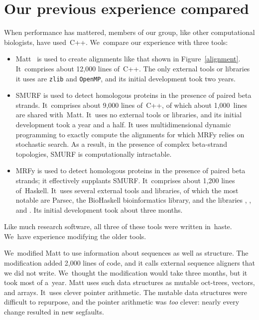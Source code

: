 \documentclass[nonatbib]{sigplanconf}
\newcommand\figref[1]{Figure~\ref{#1}}
\newcommand\seclabel[1]{\label{sec:#1}}
\let\cite\citep
\begin{document}
 
 
\section{Our previous experience compared}
\seclabel{comparo}

When performance has mattered, members of our group, like other
computational biologists, have used~C++.
We~compare our experience with three tools:
\begin{itemize}
\item
Matt~\cite{Menke:2008wu} is used to create alignments like that shown
in \figref{alignment}.
It~comprises about 12,000 lines of~C++.
The only external tools or libraries it uses are \texttt{zlib}
and \texttt{OpenMP}, and its initial development took two years.
\item
SMURF
\cite{Menke:2010ti} is used to detect homologous proteins in the presence
of paired beta strands.
It~comprises about 9,000 lines of~C++, of which about 1,000~lines are
shared with~Matt.
It~uses no external tools or libraries, and
its initial development took a year and a half.
It uses multidimensional dynamic programming to exactly compute the alignments
for which MRFy relies on stochastic search.
As a result, in the presence of complex beta-strand topologies, SMURF is
computationally intractable.
\item
MRFy is used to detect homologous proteins in the presence of paired
beta strands; it effectively supplants SMURF.
It~comprises about 1,200 lines of~Haskell.
It~uses several external tools and libraries, of which the most
notable are Parsec, the BioHaskell bioinformatics library, and
the libraries , ,
and .
Its initial development took about three months.
\end{itemize}
Like much research software, all three of these tools were written
 in~haste.
We~have experience modifying the older tools.



We~modified Matt to use information about sequences as well as structure.
The modification added 2,000 lines of code, and it calls
external sequence aligners that we did not write.
We~thought the modification would take three months, 
but it took most of a~year.
Matt uses such
data structures as mutable oct-trees, vectors, and arrays.
It~uses clever pointer arithmetic.
The mutable data structures were difficult to 
repurpose, and the pointer arithmetic was \emph{too} clever: 
nearly every change resulted in new segfaults.
\end{document}
